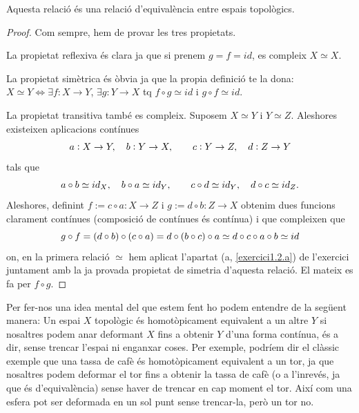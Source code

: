 \documentclass[../main.tex]{subfiles}
\begin{document}
\begin{prop}
[Exercici 1.2.b]\label{exercici1.2.b} Aquesta relació és una relació d'equivalència entre espais topològics. 
\end{prop}
\begin{proof}
Com sempre, hem de provar les tres propietats. 

La propietat reflexiva és clara ja que si prenem $g=f=id$, es compleix $X\simeq X$.

La propietat simètrica és òbvia ja que la propia definició te la dona: $X\simeq Y \Longleftrightarrow \exists f:X\rightarrow Y$, $\exists g:Y\rightarrow X$ tq $f\circ g\simeq id$ i $g\circ f\simeq id$.

La propietat transitiva també es compleix. Suposem $X\simeq Y$ i $Y\simeq Z$. Aleshores existeixen aplicacions contínues
\begin{equation}
    \notag
    a:X\rightarrow Y,\quad b:Y\rightarrow X,\qquad c:Y\rightarrow Z,\quad d:Z\rightarrow Y
\end{equation}
tals que
\begin{equation}
    \notag
    a\circ b\simeq id_X,\quad b\circ a\simeq id_Y,\qquad c\circ d \simeq id_Y,\quad d\circ c\simeq id_Z.
\end{equation}
Aleshores, definint $f:=c\circ a:X\rightarrow Z$ i $g:=d\circ b:Z\rightarrow X$ obtenim dues funcions clarament contínues (composició de contínues és contínua) i que compleixen que
\begin{equation}
    \notag
    g\circ f = (d\circ b)\circ(c\circ a) = d\circ(b\circ c)\circ a \simeq d\circ c\circ a\circ b\simeq id
\end{equation}
on, en la primera relació $\simeq$ hem aplicat l'apartat (a, \ref{exercici1.2.a}) de l'exercici juntament amb la ja provada propietat de simetria d'aquesta relació. El mateix es fa per $f\circ g$.
\end{proof}

Per fer-nos una idea mental del que estem fent ho podem entendre de la següent manera: Un espai $X$ topològic és homotòpicament equivalent a un altre $Y$ si nosaltres podem anar deformant $X$ fins a obtenir $Y$ d'una forma contínua, és a dir, sense trencar l'espai ni enganxar coses. Per exemple, podríem dir el clàssic exemple que una tassa de cafè és homotòpicament equivalent a un tor, ja que nosaltres podem deformar el tor fins a obtenir la tassa de cafè (o a l'inrevés, ja que és d'equivalència) sense haver de trencar en cap moment el tor. Així com una esfera pot ser deformada en un sol punt sense trencar-la, però un tor no.
\end{document}
